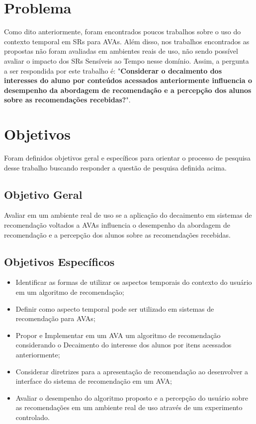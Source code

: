 \section{Problema}

Como dito anteriormente, foram encontrados poucos trabalhos sobre o uso do contexto temporal em SRs para AVAs. Além disso,
nos trabalhos encontrados as propostas não foram avaliadas em ambientes reais de uso, não sendo possível avaliar o
impacto dos SRs Sensíveis ao Tempo nesse domínio. Assim, a pergunta a ser respondida por este trabalho
é: "\textbf{Considerar o decaimento dos interesses do aluno por conteúdos acessados anteriormente influencia o desempenho
da abordagem de recomendação e a percepção dos alunos sobre as recomendações recebidas?}".

\section{Objetivos}

Foram definidos objetivos geral e específicos para orientar o processo de pesquisa desse trabalho buscando responder a questão
de pesquisa definida acima.

\subsection{Objetivo Geral}

Avaliar em um ambiente real de uso se a aplicação do decaimento em sistemas de recomendação voltados a AVAs influencia o
desempenho da abordagem de recomendação e a percepção dos alunos sobre as recomendações recebidas.

\subsection{Objetivos Específicos}

\begin{itemize}
\item Identificar as formas de utilizar os aspectos temporais do contexto do usuário em um algoritmo de recomendação;
\item Definir como aspecto temporal pode ser utilizado em sistemas de recomendação para AVAs;
\item Propor e Implementar em um AVA um algoritmo de recomendação considerando o Decaimento do interesse dos alunos por itens
acessados anteriormente;
\item Considerar diretrizes para a apresentação de recomendação ao desenvolver a interface do sistema de recomendação
em um AVA;
\item Avaliar o desempenho do algoritmo proposto e a percepção do usuário sobre as recomendações em um ambiente real de uso
através de um experimento controlado.
\end{itemize}

